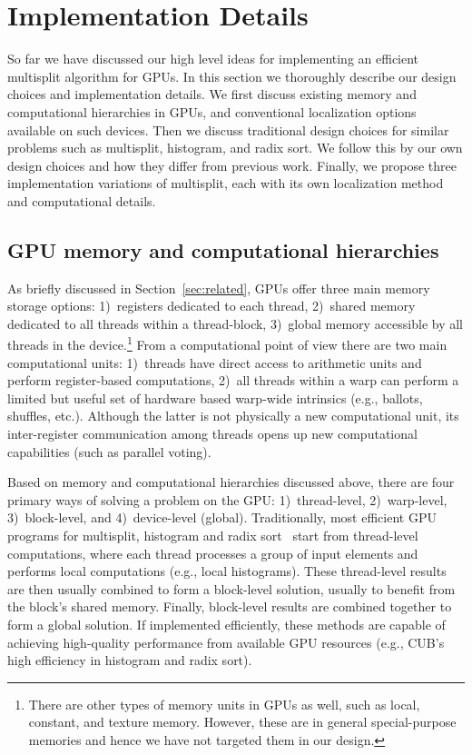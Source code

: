 \section{Implementation Details}\label{sec:impl_details}
So far we have discussed our high level ideas for implementing an efficient multisplit algorithm for GPUs. In this section we thoroughly describe our design choices and implementation details.
We first discuss existing memory and computational hierarchies in GPUs, and conventional localization options available on such devices.
Then we discuss traditional design choices for similar problems such as multisplit, histogram, and radix sort.
We follow this by our own design choices and how they differ from previous work.
Finally, we propose three implementation variations of multisplit, each with its own localization method and computational details.

\subsection{GPU memory and computational hierarchies}\label{subsec:gpu_hierarchy}
As briefly discussed in Section~\ref{sec:related}, GPUs offer three main memory storage options: 1)~registers dedicated to each thread, 2)~shared memory dedicated to all threads within a thread-block, 3)~global memory accessible by all threads in the device.\footnote{There are other types of memory units in GPUs as well, such as local, constant, and texture memory. However, these are in general special-purpose memories and hence we have not targeted them in our design.}
From a computational point of view there are two main computational units: 1)~threads have direct access to arithmetic units and perform register-based computations, 2)~all threads within a warp can perform a limited but useful set of hardware based warp-wide intrinsics (e.g., ballots, shuffles, etc.). Although the latter is not physically a new computational unit, its inter-register communication among threads opens up new computational capabilities (such as parallel voting).

Based on memory and computational hierarchies discussed above, there are four primary ways of solving a problem on the GPU: 1)~thread-level, 2)~warp-level, 3)~block-level, and 4)~device-level (global).
Traditionally, most efficient GPU programs for multisplit, histogram and radix sort~\cite{He:2008:RJG, Bell:2011:TAP, Merrill:2015:CUB} start from  thread-level computations, where each thread processes a group of input elements and performs local computations (e.g., local histograms).
These thread-level results are then usually combined to form a block-level solution, usually to benefit from the block's shared memory.
Finally, block-level results are combined together to form a global solution.
If implemented efficiently, these methods are capable of achieving high-quality performance from available GPU resources (e.g., CUB's high efficiency in histogram and radix sort).

